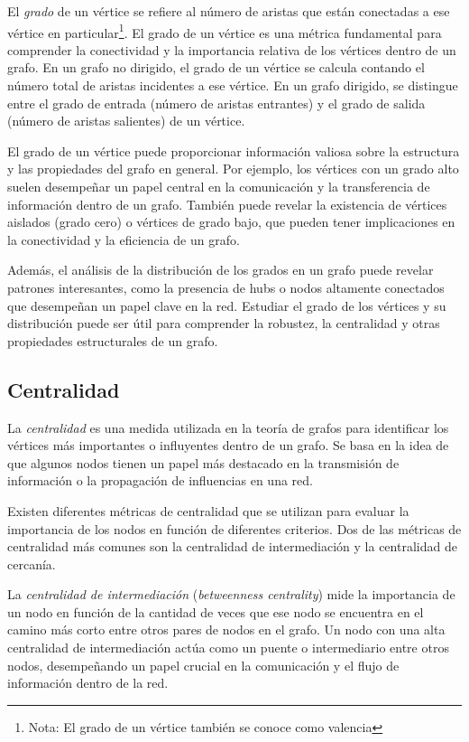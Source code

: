 El \textit{grado} de un vértice se refiere al número de aristas que están conectadas a ese vértice 
en particular\footnote{Nota: El grado de un vértice también se conoce como valencia}. El grado de 
un vértice es una métrica fundamental para comprender la conectividad y la importancia relativa de 
los vértices dentro de un grafo. En un grafo no dirigido, el grado de un vértice se calcula contando 
el número total de aristas incidentes a ese vértice. En un grafo dirigido, se distingue entre el grado 
de entrada (número de aristas entrantes) y el grado de salida (número de aristas salientes) de un 
vértice.

El grado de un vértice puede proporcionar información valiosa sobre la estructura y las propiedades 
del grafo en general. Por ejemplo, los vértices con un grado alto suelen desempeñar un papel central 
en la comunicación y la transferencia de información dentro de un grafo. También puede revelar la 
existencia de vértices aislados (grado cero) o vértices de grado bajo, que pueden tener implicaciones 
en la conectividad y la eficiencia de un grafo.

Además, el análisis de la distribución de los grados en un grafo puede revelar patrones interesantes, 
como la presencia de hubs o nodos altamente conectados que desempeñan un papel clave en la red. 
Estudiar el grado de los vértices y su distribución puede ser útil para comprender la robustez, 
la centralidad y otras propiedades estructurales de un grafo.

\subsection{Centralidad}

La \textit{centralidad} es una medida utilizada en la teoría de grafos para identificar los vértices 
más importantes o influyentes dentro de un grafo. Se basa en la idea de que algunos nodos tienen un 
papel más destacado en la transmisión de información o la propagación de influencias en una red.

Existen diferentes métricas de centralidad que se utilizan para evaluar la importancia de los 
nodos en función de diferentes criterios. Dos de las métricas de centralidad más comunes son la 
centralidad de intermediación y la centralidad de cercanía.

La \textit{centralidad de intermediación} (\textit{betweenness centrality}) mide la importancia de 
un nodo en función de la cantidad de veces que ese nodo se encuentra en el camino más corto entre 
otros pares de nodos en el grafo. Un nodo con una alta centralidad de intermediación actúa como un 
puente o intermediario entre otros nodos, desempeñando un papel crucial en la comunicación y el 
flujo de información dentro de la red.

